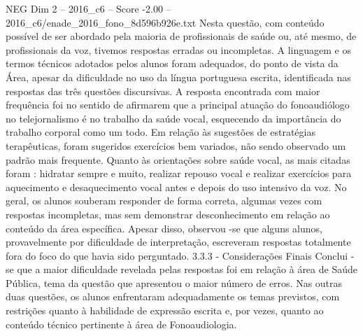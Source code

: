 \begin{textsample}{NEG Dim 2 – 2016\_c6 – Score -2.00 – 2016\_c6/enade\_2016\_fono\_8d596b926e.txt}
Nesta questão, com conteúdo possível de ser abordado pela maioria de profissionais de saúde ou, até mesmo, de profissionais da voz, tivemos respostas erradas ou incompletas.
A linguagem e os termos técnicos adotados pelos alunos foram adequados, do ponto de vista da Área, apesar da dificuldade no uso da língua portuguesa escrita, identificada nas respostas das três questões discursivas.
A resposta encontrada com maior frequência foi no sentido de afirmarem que a principal atuação do fonoaudiólogo no telejornalismo é no trabalho da saúde vocal, esquecendo da importância do trabalho corporal como um todo.
Em relação às sugestões de estratégias terapêuticas, foram sugeridos exercícios bem variados, não sendo observado um padrão mais frequente.
Quanto às orientações sobre saúde vocal, as mais citadas foram : hidratar sempre e muito, realizar repouso vocal e realizar exercícios para aquecimento e desaquecimento vocal antes e depois do uso intensivo da voz.
No geral, os alunos souberam responder de forma correta, algumas vezes com respostas incompletas, mas sem demonstrar desconhecimento em relação ao conteúdo da área específica.
Apesar disso, observou -se que alguns alunos, provavelmente por dificuldade de interpretação, escreveram respostas totalmente fora do foco do que havia sido perguntado. 3.3.3 - Considerações Finais Conclui -se que a maior dificuldade revelada pelas respostas foi em relação à área de Saúde Pública, tema da questão que apresentou o maior número de erros.
Nas outras duas questões, os alunos enfrentaram adequadamente os temas previstos, com restrições quanto à habilidade de expressão escrita e, por vezes, quanto ao conteúdo técnico pertinente à área de Fonoaudiologia.

\end{textsample}
